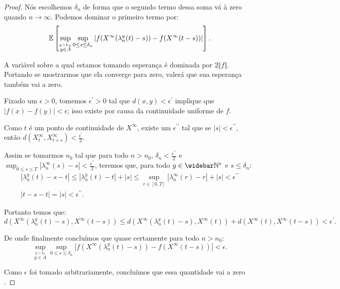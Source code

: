 \begin{proof}
  Nós escolhemos $\delta_n$ de forma que o segundo termo dessa soma vá
  à zero quando $n \to \infty$. Podemos dominar o primeiro termo por:
  \begin{displaymath}
     {\mathbb{E}} \left[ \sup_{\stackrel{y > k_n}{y\in A}}
      \sup_{0 \leq s \leq \delta_n} \left\lvert
        f(X^\infty(\lambda_n^y(t)-s)) -
        f(X^\infty(t-s))
    \right\rvert \right].
  \end{displaymath}

  A variável sobre a qual estamos tomando esperança é dominada por
  $2\Vert f \Vert$. Portando se mostrarmos que ela converge \qc para
  zero, valerá que sua esperança também vai a zero.

  Fixado um $\epsilon > 0$, tomemos $\epsilon^\prime > 0$ tal que
  $d(x, y) < \epsilon^\prime$ implique que $|f(x) - f(y)| < \epsilon$;
  isso existe por causa da continuidade uniforme de $f$.
 
  Como $t$ é \qc um ponto de continuidade de $X^\infty$, existe um
  $\epsilon^{\prime\prime}$ tal que se $|s| <
  \epsilon^{\prime\prime}$, então $d(X^\infty_t, X^\infty_{t+s}) <
  \frac{\epsilon^{\prime}}{2}$.

  Assim se tomarmos $n_0$ tal que para todo $n > n_0$, $\delta_{n} <
  \frac{\epsilon^{\prime\prime}}{2}$ e $\sup_{0 \leq s \leq T}
  |\lambda_n^\infty(s) - s| < \frac{\epsilon^{\prime\prime}}{2}$, teremos
  que, para todo $y\in\Nzb$ e $s \leq \delta_n$:
  \begin{gather*}
    |\lambda_n^y(t) - s - t| \leq 
     |\lambda_n^y(t) - t | + |s| \leq
     \sup_{r \in [0, T]} |\lambda_n^\infty(r) - r | + |s|
     < \epsilon^{\prime\prime}\\
    |t - s - t |  = |s| < \epsilon^{\prime\prime}.
  \end{gather*}
  
  Portanto temos que:
  \begin{displaymath}
    d(X^\infty(\lambda_n^y(t)-s), X^\infty(t-s)) \leq
     d(X^\infty(\lambda_n^y(t)-s), X^\infty(t))+
     d(X^\infty(t), X^\infty(t-s))
     < \epsilon^{\prime}.
  \end{displaymath}

  De onde finalmente concluímos que quase certamente para todo $n > n_0$:
  \begin{displaymath} 
    \sup_{\stackrel{y > k_n}{y \in A}}
    \sup_{0 \leq s \leq \delta_n} \left\lvert
      f(X^\infty(\lambda_n^y(t)-s)) -
      f(X^\infty(t-s))
    \right\rvert < \epsilon .
  \end{displaymath}

  Como $\epsilon$ foi tomado arbitrariamente, concluímos que essa
  quantidade vai a zero \qc.
\end{proof}

